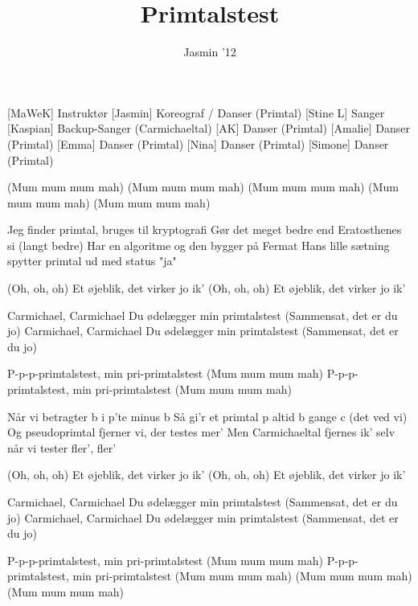 \documentclass[a4paper,11pt]{article}
\title{Primtalstest}
\author{Jasmin '12}
\begin{document}
\maketitle

\begin{roles}
[MaWeK] Instruktør
[Jasmin] Koreograf / Danser (Primtal)
[Stine L] Sanger
[Kaspian] Backup-Sanger (Carmichaeltal)
[AK] Danser (Primtal)
[Amalie] Danser (Primtal)
[Emma] Danser (Primtal)
[Nina] Danser (Primtal)
[Simone] Danser (Primtal)
\end{roles}

\begin{song}
 (Mum mum mum mah)
(Mum mum mum mah)
(Mum mum mum mah)
(Mum mum mum mah)
(Mum mum mum mah)

 Jeg finder primtal, bruges til kryptografi
Gør det meget bedre end Eratosthenes si (langt bedre)
Har en algoritme og den bygger på Fermat
Hans lille sætning spytter primtal ud med status "ja"

 (Oh, oh, oh)
 Et øjeblik, det virker jo ik'
 (Oh, oh, oh)
 Et øjeblik, det virker jo ik'

 Carmichael, Carmichael
Du ødelægger min primtalstest
 (Sammensat, det er du jo)
 Carmichael, Carmichael
Du ødelægger min primtalstest
 (Sammensat, det er du jo)

 P-p-p-primtalstest, min pri-primtalstest
 (Mum mum mum mah)
 P-p-p-primtalstest, min pri-primtalstest
 (Mum mum mum mah)

 Når vi betragter b i p'te minus b
Så gi'r et primtal p altid b gange c (det ved vi)
Og pseudoprimtal fjerner vi, der testes mer'
Men Carmichaeltal fjernes ik' selv når vi tester fler', fler'

 (Oh, oh, oh)
 Et øjeblik, det virker jo ik'
 (Oh, oh, oh)
 Et øjeblik, det virker jo ik'

 Carmichael, Carmichael
Du ødelægger min primtalstest
 (Sammensat, det er du jo)
 Carmichael, Carmichael
Du ødelægger min primtalstest
 (Sammensat, det er du jo)

 P-p-p-primtalstest, min pri-primtalstest
 (Mum mum mum mah)
 P-p-p-primtalstest, min pri-primtalstest
 (Mum mum mum mah)
(Mum mum mum mah)
(Mum mum mum mah)


\end{song}
\end{document}
